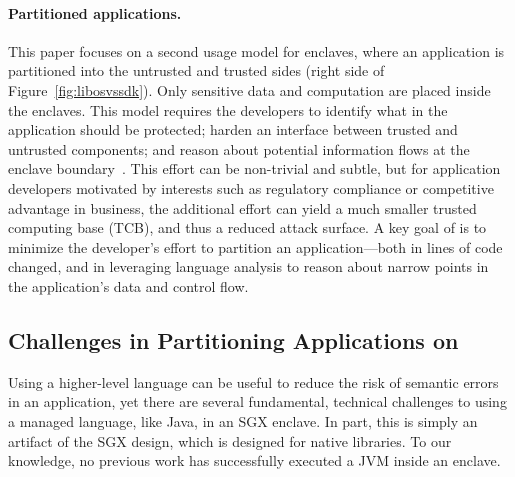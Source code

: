 \paragraph{Partitioned applications.}
This paper focuses on a second usage model for enclaves, where an application is partitioned into
the untrusted and trusted sides (right side of Figure~\ref{fig:libosvssdk}).
Only sensitive data and computation are placed inside the enclaves.
This model requires the developers to
identify what in the application should be protected; harden an interface between trusted and untrusted components; 
and reason about potential information flows at the enclave boundary~\citep{kilpatrick2003privman}.
This effort can be non-trivial and subtle, but for application developers motivated by interests such as 
regulatory compliance or competitive advantage in business, the additional effort can yield a much smaller trusted computing
base (TCB), and thus a reduced attack surface.
A key goal of \systemname{} is to minimize the developer's effort to partition an application---both in lines of 
code changed, and in leveraging language analysis to reason about narrow points in the application's data and control flow.

\subsection{Challenges in Partitioning \java{} Applications on \sgx{}}

Using a higher-level language can be useful to reduce the risk of semantic errors in an application,
yet there are several fundamental, technical challenges to using a managed language, like Java,
in an SGX enclave.
In part, this is simply an artifact of the SGX design, which is designed
for native libraries.
To our knowledge, no previous work has successfully executed a JVM inside an enclave.

  
